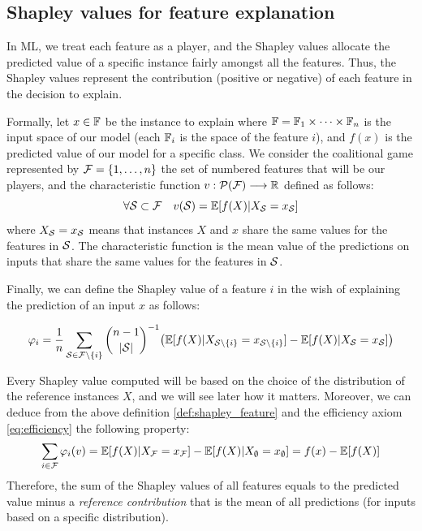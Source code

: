 \subsection{Shapley values for feature explanation}

In ML, we treat each feature as a player, and the Shapley values allocate the predicted value of a specific instance fairly amongst all the features. 
Thus, the Shapley values represent the contribution (positive or negative) of each feature in the decision to explain.

Formally, let $x \in \mathbb{F}$ be the instance to explain where $\mathbb{F} = \mathbb{F}_1 \times \cdots \times \mathbb{F}_n$ is the input space 
of our model (each $\mathbb{F}_i$ is the space of the feature $i$), and $f(x)$ is the predicted value of our model 
for a specific class. We consider the coalitional game represented 
by $\mathcal{F} = \{1, \dots, n \}$ the set of numbered features that will be our players, and the characteristic 
function $v : \mathcal{P}(\mathcal{F}) \longrightarrow \mathbb{R}$ defined as follows:
\begin{equation}
    \forall \mathcal{S} \subset \mathcal{F} \quad v(\mathcal{S}) = \mathbb{E}[f(X) | X_{\mathcal{S}} = x_{\mathcal{S}}]
\end{equation}
where $X_{\mathcal{S}} = x_{\mathcal{S}}$ means that instances $X$ and $x$ share the same values for the features in $\mathcal{S}$. The characteristic function is the mean value of the predictions on inputs that share the same values for the 
features in $\mathcal{S}$.

Finally, we can define the Shapley value of a feature $i$ in the wish of explaining the prediction of an 
input $x$ as follows:
\begin{definition}
    \label{def:shapley_feature}
    \begin{equation}
        \varphi_i = \frac{1}{n} \sum_{\mathcal{S} \in \mathcal{F}\backslash\{i\}} \binom{n-1}{|\mathcal{S}|}^{-1} \bigl( \mathbb{E}[f(X) | X_{\mathcal{S}\backslash\{i\}} = x_{\mathcal{S}\backslash\{i\}}] - \mathbb{E}[f(X) | X_{\mathcal{S}} = x_{\mathcal{S}}] \bigr)
    \end{equation}
\end{definition}

\begin{remark}
    Every Shapley value computed will be based on the choice of the distribution of the reference instances 
    $X$, and we will see later how it matters. Moreover, we can deduce from the above definition \ref{def:shapley_feature} and the 
    efficiency axiom \ref{eq:efficiency} the following property:
    \begin{equation}
        \sum_{i \in \mathcal{F}} \varphi_i(v) = \mathbb{E}[f(X) | X_{\mathcal{F}} = x_{\mathcal{F}}] - \mathbb{E}[f(X) | X_{\emptyset} = x_{\emptyset}] = f(x) - \mathbb{E}[f(X)]
    \end{equation} 
    Therefore, the sum of the Shapley values of all features equals to the predicted value minus a \textit{reference contribution} that is the mean of all predictions (for inputs based on a specific distribution).
\end{remark}


